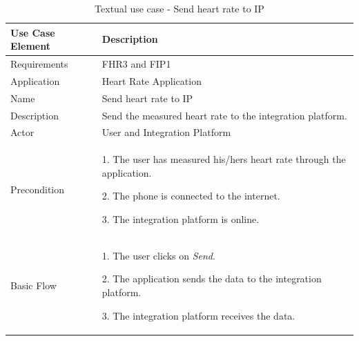 \begin{table}[h]
\begin{center}
\begin{tabular}{ l | p{10cm} }
  \hline
  \textbf{Use Case Element} & \textbf{Description} \\ \hline\hline
  Requirements & FHR3 and FIP1 \\ \hline
  Application & Heart Rate Application \\ \hline
  Name & Send heart rate to IP \\ \hline
  Description & Send the measured heart rate to the integration platform. \\ \hline
  Actor & User and Integration Platform \\ \hline
  Precondition &
    \par 1. The user has measured his/hers heart rate through the application.
    \par 2. The phone is connected to the internet.
    \par 3. The integration platform is online.
  \\ \hline
  Basic Flow & 
  	\par 1. The user clicks on \textit{Send}.
  	\par 2. The application sends the data to the integration platform.
  	\par 3. The integration platform receives the data.
  \\ \hline
\end{tabular}
\end{center}
\caption{Textual use case - Send heart rate to IP}
\label{table:use-case-send-heart-rate-to-ip}
\end{table}

